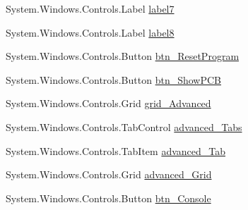 \begin{DoxyCompactItemize}
\item 
System.\+Windows.\+Controls.\+Label \hyperlink{class_c_p_u___o_s___simulator_1_1_main_window_a38ed6363fd03954967bda7a099f6b07e}{label7}
\item 
System.\+Windows.\+Controls.\+Label \hyperlink{class_c_p_u___o_s___simulator_1_1_main_window_a216fc6a1692d8a8f8b80b08348c1dcd4}{label8}
\item 
System.\+Windows.\+Controls.\+Button \hyperlink{class_c_p_u___o_s___simulator_1_1_main_window_ada16565fc869dea1d54013009f5892b4}{btn\+\_\+\+Reset\+Program}
\item 
System.\+Windows.\+Controls.\+Button \hyperlink{class_c_p_u___o_s___simulator_1_1_main_window_a967a1b3dbde7ecb1d8091e5eababcc58}{btn\+\_\+\+Show\+P\+C\+B}
\item 
System.\+Windows.\+Controls.\+Grid \hyperlink{class_c_p_u___o_s___simulator_1_1_main_window_a65cbc082cd4737ec0dd8837efa715510}{grid\+\_\+\+Advanced}
\item 
System.\+Windows.\+Controls.\+Tab\+Control \hyperlink{class_c_p_u___o_s___simulator_1_1_main_window_a409f822cf5503ff0a45e14fb0f86a2aa}{advanced\+\_\+\+Tabs}
\item 
System.\+Windows.\+Controls.\+Tab\+Item \hyperlink{class_c_p_u___o_s___simulator_1_1_main_window_aa0cf25219ff7ec68cccc82f780e5f817}{advanced\+\_\+\+Tab}
\item 
System.\+Windows.\+Controls.\+Grid \hyperlink{class_c_p_u___o_s___simulator_1_1_main_window_a50b3891532cc5bfd0cc44e657bf95374}{advanced\+\_\+\+Grid}
\item 
System.\+Windows.\+Controls.\+Button \hyperlink{class_c_p_u___o_s___simulator_1_1_main_window_a9c127982ee67a80b67a9184b3a6e83d3}{btn\+\_\+\+Console}
\end{DoxyCompactItemize}

